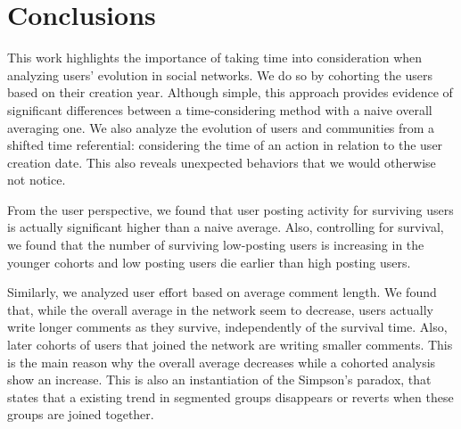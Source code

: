 %

\section{Conclusions}

This work highlights the importance of taking time into consideration when analyzing users' evolution in social networks. We do so by cohorting the users based on their creation year. Although simple, this approach provides evidence of significant differences between a time-considering method with a naive overall averaging one. We also analyze the evolution of users and communities from a shifted time referential: considering the time of an action in relation to the user creation date. This also reveals unexpected behaviors that we would otherwise not notice.

From the user perspective, we found that user posting activity for surviving users is actually significant higher than a naive average. Also, controlling for survival, we found that the number of surviving low-posting users is increasing in the younger cohorts and low posting users die earlier than high posting users. 

Similarly, we analyzed user effort based on average comment length. We found that, while the overall average in the network seem to decrease, users actually write longer comments as they survive, independently of the survival time. Also, later cohorts of users that joined the network are writing smaller comments. This is the main reason why the overall average decreases while a cohorted analysis show an increase. This is also an instantiation of the Simpson's paradox, that states that a existing trend in segmented groups disappears or reverts when these groups are joined together.

